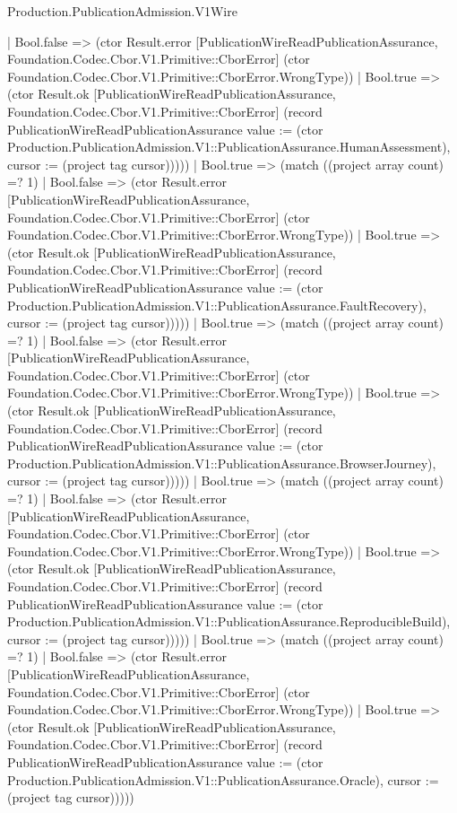 \begin{lexlean}{Production.PublicationAdmission.V1Wire}
\begin{semanticmodule}
{                    | Bool.false => (ctor Result.error [PublicationWireReadPublicationAssurance, Foundation.Codec.Cbor.V1.Primitive::CborError] (ctor Foundation.Codec.Cbor.V1.Primitive::CborError.WrongType))
                    | Bool.true => (ctor Result.ok [PublicationWireReadPublicationAssurance, Foundation.Codec.Cbor.V1.Primitive::CborError] (record PublicationWireReadPublicationAssurance {value := (ctor Production.PublicationAdmission.V1::PublicationAssurance.HumanAssessment), cursor := (project tag cursor)}))))
                | Bool.true => (match ((project array count) =? 1)
                  | Bool.false => (ctor Result.error [PublicationWireReadPublicationAssurance, Foundation.Codec.Cbor.V1.Primitive::CborError] (ctor Foundation.Codec.Cbor.V1.Primitive::CborError.WrongType))
                  | Bool.true => (ctor Result.ok [PublicationWireReadPublicationAssurance, Foundation.Codec.Cbor.V1.Primitive::CborError] (record PublicationWireReadPublicationAssurance {value := (ctor Production.PublicationAdmission.V1::PublicationAssurance.FaultRecovery), cursor := (project tag cursor)}))))
              | Bool.true => (match ((project array count) =? 1)
                | Bool.false => (ctor Result.error [PublicationWireReadPublicationAssurance, Foundation.Codec.Cbor.V1.Primitive::CborError] (ctor Foundation.Codec.Cbor.V1.Primitive::CborError.WrongType))
                | Bool.true => (ctor Result.ok [PublicationWireReadPublicationAssurance, Foundation.Codec.Cbor.V1.Primitive::CborError] (record PublicationWireReadPublicationAssurance {value := (ctor Production.PublicationAdmission.V1::PublicationAssurance.BrowserJourney), cursor := (project tag cursor)}))))
            | Bool.true => (match ((project array count) =? 1)
              | Bool.false => (ctor Result.error [PublicationWireReadPublicationAssurance, Foundation.Codec.Cbor.V1.Primitive::CborError] (ctor Foundation.Codec.Cbor.V1.Primitive::CborError.WrongType))
              | Bool.true => (ctor Result.ok [PublicationWireReadPublicationAssurance, Foundation.Codec.Cbor.V1.Primitive::CborError] (record PublicationWireReadPublicationAssurance {value := (ctor Production.PublicationAdmission.V1::PublicationAssurance.ReproducibleBuild), cursor := (project tag cursor)}))))
          | Bool.true => (match ((project array count) =? 1)
            | Bool.false => (ctor Result.error [PublicationWireReadPublicationAssurance, Foundation.Codec.Cbor.V1.Primitive::CborError] (ctor Foundation.Codec.Cbor.V1.Primitive::CborError.WrongType))
            | Bool.true => (ctor Result.ok [PublicationWireReadPublicationAssurance, Foundation.Codec.Cbor.V1.Primitive::CborError] (record PublicationWireReadPublicationAssurance {value := (ctor Production.PublicationAdmission.V1::PublicationAssurance.Oracle), cursor := (project tag cursor)}))))
}
\end{semanticmodule}
\end{lexlean}
